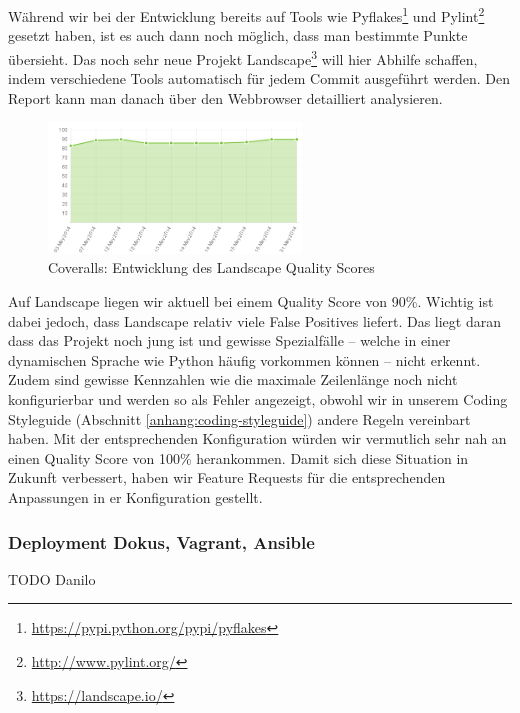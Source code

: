 Während wir bei der Entwicklung bereits auf Tools wie
Pyflakes\footnote{\url{https://pypi.python.org/pypi/pyflakes}} und
Pylint\footnote{\url{http://www.pylint.org/}} gesetzt haben, ist es auch dann
noch möglich, dass man bestimmte Punkte übersieht. Das noch sehr neue Projekt
Landscape\footnote{\url{https://landscape.io/}} will hier Abhilfe schaffen,
indem verschiedene Tools automatisch für jedem Commit ausgeführt werden. Den
Report kann man danach über den Webbrowser detailliert analysieren.

\begin{figure}[H]
	\centering
	\includegraphics[width=0.6\textwidth]{images/landscape}
	\caption{Coveralls: Entwicklung des Landscape Quality Scores}
	\label{improvements:landscape}
\end{figure}

Auf Landscape liegen wir aktuell bei einem Quality Score von 90\%. Wichtig ist
dabei jedoch, dass Landscape relativ viele False Positives liefert. Das liegt
daran dass das Projekt noch jung ist und gewisse Spezialfälle -- welche in einer
dynamischen Sprache wie Python häufig vorkommen können -- nicht erkennt. Zudem
sind gewisse Kennzahlen wie die maximale Zeilenlänge noch nicht konfigurierbar
und werden so als Fehler angezeigt, obwohl wir in unserem Coding Styleguide
(Abschnitt \ref{anhang:coding-styleguide}) andere Regeln vereinbart haben. Mit
der entsprechenden Konfiguration würden wir vermutlich sehr nah an einen Quality
Score von 100\% herankommen. Damit sich diese Situation in Zukunft verbessert,
haben wir Feature Requests für die entsprechenden Anpassungen in er
Konfiguration gestellt.


\subsubsection{Deployment Dokus, Vagrant, Ansible}

TODO Danilo

